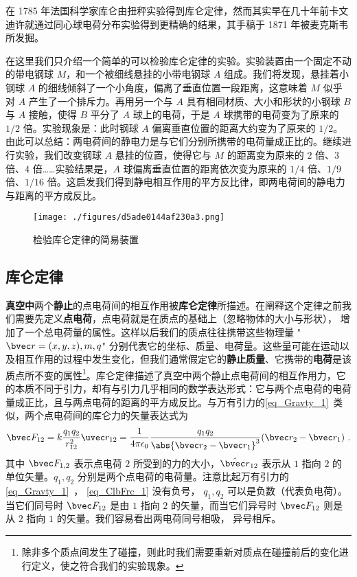 

在 1785 年法国科学家库仑由扭秤实验得到库仑定律，然而其实早在几十年前卡文迪许就通过同心球电荷分布实验得到更精确的结果，其手稿于 1871 年被麦克斯韦所发掘。

在这里我们只介绍一个简单的可以检验库仑定律的实验。实验装置由一个固定不动的带电钢球 $M$，和一个被细线悬挂的小带电钢球 $A$ 组成。我们将发现，悬挂着小钢球 $A$ 的细线倾斜了一个小角度，偏离了垂直位置一段距离，这意味着 $M$ 似乎对 $A$ 产生了一个排斥力。再用另一个与 $A$ 具有相同材质、大小和形状的小钢球 $B$ 与 $A$ 接触，使得 $B$ 平分了 $A$ 球上的电荷，于是 $A$ 球携带的电荷变为了原来的 $1/2$ 倍。实验现象是：此时钢球 $A$ 偏离垂直位置的距离大约变为了原来的 $1/2$。由此可以总结：两电荷间的静电力是与它们分别所携带的电荷量成正比的。继续进行实验，我们改变钢球 $A$ 悬挂的位置，使得它与 $M$ 的距离变为原来的 $2$ 倍、$3$ 倍、$4$ 倍……实验结果是，$A$ 球偏离垂直位置的距离依次变为原来的 $1/4$ 倍、$1/9$ 倍、$1/16$ 倍。这启发我们得到静电相互作用的平方反比律，即两电荷间的静电力与距离的平方成反比。
\begin{figure}[ht]
\centering
\texttt{[image: ./figures/d5ade0144af230a3.png]}
\caption{检验库仑定律的简易装置} \label{fig_ClbFrc_1}
\end{figure}


\subsection{库仑定律}
\textbf{真空中}两个\textbf{静止}的点电荷间的相互作用被\textbf{库仑定律}所描述。在阐释这个定律之前我们需要先定义\textbf{点电荷}，点电荷就是在质点的基础上（忽略物体的大小与形状）， 增加了一个总电荷量的属性。这样以后我们的质点往往携带这些物理量 "$\bvec r=(x,y,z),m,q$" 分别代表它的坐标、质量、电荷量。这些量可能在运动以及相互作用的过程中发生变化，但我们通常假定它的\textbf{静止质量}、它携带的\textbf{电荷}是该质点所不变的属性\footnote{除非多个质点间发生了碰撞，则此时我们需要重新对质点在碰撞前后的变化进行定义，使之符合我们的实验现象。}。库仑定律描述了真空中两个静止点电荷间的相互作用力，它的本质不同于引力，却有与引力几乎相同的数学表达形式：它与两个点电荷的电荷量成正比，且与两点电荷的距离的平方成反比。与万有引力的\autoref{eq_Gravty_1}~类似，两个点电荷间的库仑力的矢量表达式为
\begin{equation}\label{eq_ClbFrc_1}
\bvec F_{12} = k\frac{q_1 q_2}{r_{12}^2} \uvec r_{12} = \frac{1}{4\pi\epsilon_0} \frac{q_1 q_2}{\abs{\bvec r_2 - \bvec r_1}^3}(\bvec r_2 - \bvec r_1)~.
\end{equation}
其中 $\bvec F_{1,2}$ 表示点电荷 $2$ 所受到的力的大小，$\hat{\bvec r}_{12}$ 表示从 $1$ 指向 $2$ 的单位矢量。$q_1, q_2$ 分别是两个点电荷的电荷量。注意比起万有引力的\autoref{eq_Gravty_1}~， \autoref{eq_ClbFrc_1} 没有负号， $q_1, q_2$ 可以是负数（代表负电荷）。当它们同号时 $\bvec F_{12}$ 是由 $1$ 指向 $2$ 的矢量，而当它们异号时 $\bvec F_{12}$ 则是从 $2$ 指向 $1$ 的矢量。我们容易看出两电荷同号相吸， 异号相斥。

